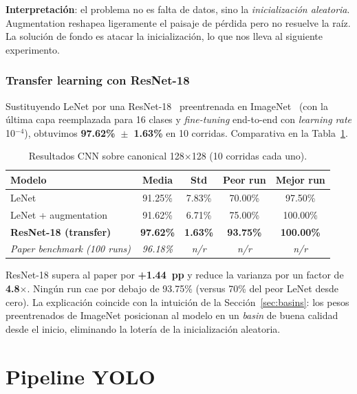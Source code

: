 \documentclass[a4paper,11pt]{article}
\begin{document}
\textbf{Interpretación}: el problema no es falta de datos, sino la \emph{inicialización aleatoria}. Augmentation reshapea ligeramente el paisaje de pérdida pero no resuelve la raíz. La solución de fondo es atacar la inicialización, lo que nos lleva al siguiente experimento.

\subsubsection{Transfer learning con ResNet-18}

Sustituyendo LeNet por una ResNet-18~\cite{he2016deep} preentrenada en ImageNet~\cite{deng2009imagenet} (con la última capa reemplazada para 16 clases y \textit{fine-tuning} end-to-end con \textit{learning rate} 10$^{-4}$), obtuvimos \textbf{97.62\%~$\pm$~1.63\%} en 10 corridas. Comparativa en la Tabla~\ref{tab:cnn-comparison}.

\begin{table}[h]
\centering
\caption{Resultados CNN sobre canonical 128$\times$128 (10 corridas cada uno).}
\label{tab:cnn-comparison}
\begin{tabular}{lcccc}
\toprule
\textbf{Modelo} & \textbf{Media} & \textbf{Std} & \textbf{Peor run} & \textbf{Mejor run} \\
\midrule
LeNet & 91.25\% & 7.83\% & 70.00\% & 97.50\% \\
LeNet + augmentation & 91.62\% & 6.71\% & 75.00\% & 100.00\% \\
\textbf{ResNet-18 (transfer)} & \textbf{97.62\%} & \textbf{1.63\%} & \textbf{93.75\%} & \textbf{100.00\%} \\
\midrule
\textit{Paper benchmark (100 runs)} & \textit{96.18\%} & \textit{n/r} & \textit{n/r} & \textit{n/r} \\
\bottomrule
\end{tabular}
\end{table}

ResNet-18 supera al paper por \textbf{+1.44~pp} y reduce la varianza por un factor de \textbf{4.8$\times$}. Ningún run cae por debajo de 93.75\% (versus 70\% del peor LeNet desde cero). La explicación coincide con la intuición de la Sección~\ref{sec:basins}: los pesos preentrenados de ImageNet posicionan al modelo en un \textit{basin} de buena calidad desde el inicio, eliminando la lotería de la inicialización aleatoria.

\section{Pipeline YOLO}
\label{sec:yolo-pipeline}
\end{document}
